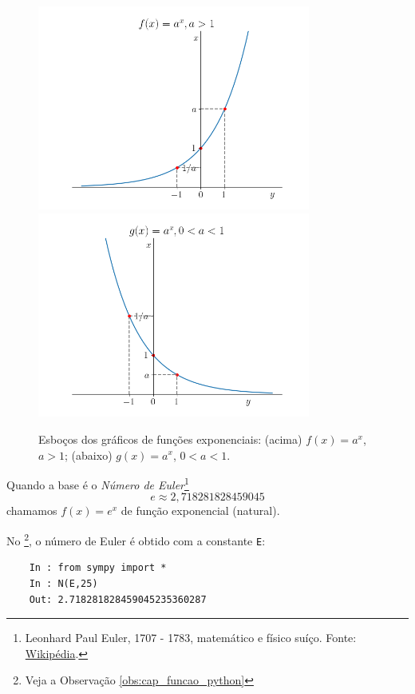 \begin{figure}[H]
  \centering
  \includegraphics[width=0.8\textwidth]{./cap_funcao/dados/fig_exponencial_graficos/fig1}\\
  \includegraphics[width=0.8\textwidth]{./cap_funcao/dados/fig_exponencial_graficos/fig2}
  \caption{Esboços dos gráficos de funções exponenciais: (acima) $f(x) = a^x$, $a>1$; (abaixo) $g(x) = a^x$, $0<a<1$.}
  \label{fig:exponencial_graficos}
\end{figure}

\begin{obs}
  Quando a base é o \emph{Número de Euler}\footnote{Leonhard Paul Euler, 1707 - 1783, matemático e físico suíço. Fonte: \href{https://pt.wikipedia.org/wiki/Leonhard_Euler}{Wikipédia}.}
  \begin{equation}
    e \approx 2,718281828459045
  \end{equation}
  chamamos $f(x) = e^x$ de função exponencial (natural).

  \ifispython
  No \sympy\footnote{Veja a Observação \ref{obs:cap_funcao_python}}, o número de Euler é obtido com a constante \verb+E+:
  \begin{lstlisting}
    In : from sympy import *
    In : N(E,25)
    Out: 2.718281828459045235360287
  \end{lstlisting}
  \fi
\end{obs}

